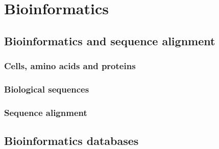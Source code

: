 
\chapter{Bioinformatics} %

\label{Chapter1} %



\section{Bioinformatics and sequence alignment}

\subsection{Cells, amino acids and proteins}


\subsection{Biological sequences}


\subsection{Sequence alignment}


\section{Bioinformatics databases}

